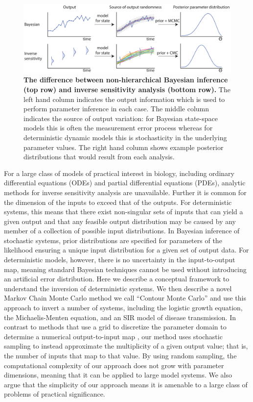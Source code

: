 \documentclass[10pt,letterpaper]{article}
\begin{document}
\begin{figure}[H]
	\centerline{\includegraphics[width=1.25\textwidth]{../figures/comparing_bayes_sensitivity.pdf}}
	\caption{\textbf{The difference between non-hierarchical Bayesian inference (top row) and inverse sensitivity analysis (bottom row).} The left hand column indicates the output information which is used to perform parameter inference in each case. The middle column indicates the source of output variation: for Bayesian state-space models this is often the measurement error process whereas for deterministic dynamic models this is stochasticity in the underlying parameter values. The right hand column shows example posterior distributions that would result from each analysis.}
	\label{fig:difference_between_bayes_invsensitivity}
\end{figure}

For a large class of models of practical interest in biology, including ordinary differential equations (ODEs) and partial differential equations (PDEs), analytic methods for inverse sensitivity analysis  are unavailable. Further it is common for the dimension of the inputs to exceed that of the outputs. For deterministic systems, this means that there exist non-singular sets of inputs that can yield a given output and that any feasible output distribution may be caused by any member of a collection of possible input distributions. In Bayesian inference of stochastic systems, prior distributions are specified for parameters of the likelihood ensuring a unique input distribution for a given set of output data. For deterministic models, however, there is no uncertainty in the input-to-output map, meaning standard Bayesian techniques cannot be used without introducing an artificial error distribution. Here we describe a conceptual framework to understand the inversion of deterministic systems. We then describe a novel Markov Chain Monte Carlo method we call ``Contour Monte Carlo'' and use this approach to invert a number of systems, including the logistic growth equation, the Michaelis-Menten equation, and an SIR model of disease transmission. In contrast to methods that use a grid to discretize the parameter domain to determine a numerical output-to-input map \cite{butler2014measure}, our method uses stochastic sampling to instead approximate the multiplicity of a given output value; that is, the number of inputs that map to that value. By using random sampling, the computational complexity of our approach does not grow with parameter dimensions, meaning that it can be applied to large model systems. We also argue that the simplicity of our approach means it is amenable to a large class of problems of practical significance.
\end{document}
